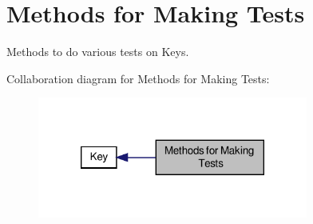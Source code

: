 \hypertarget{group__keytest}{\section{Methods for Making Tests}
\label{group__keytest}
}


Methods to do various tests on Keys.  


Collaboration diagram for Methods for Making Tests\-:\nopagebreak
\begin{figure}[H]
\begin{center}
\leavevmode
\includegraphics[width=252pt]{group__keytest}
\end{center}
\end{figure}
